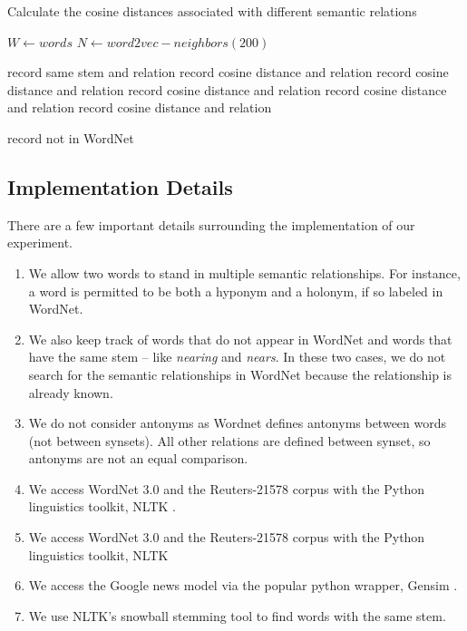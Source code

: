 \documentclass[titlepage]{article}
\begin{document}
\begin{algorithm}
\caption{Calculate the cosine distances associated with different semantic relations}
\begin{algorithmic}
\label{alg1}
\STATE $W \leftarrow words$
\STATE $N \leftarrow word2vec-neighbors(200)$

\STATE record same stem and relation 
\ELSE
{} 
\STATE record cosine distance and relation 
\ENDIF
{} 
\STATE record cosine distance and relation 
\ENDIF
{} 
\STATE record cosine distance and relation 
\ENDIF
{} 
\STATE record cosine distance and relation 
\ENDIF
{} 
\STATE record cosine distance and relation 
\ENDIF
\ENDIF

\ELSE
\STATE record not in WordNet

\ENDIF

\ENDFOR
\ENDFOR
\end{algorithmic}
\end{algorithm}

\subsection{Implementation Details}

There are a few important details surrounding the implementation of our experiment. 

\begin{enumerate}
  \item We allow two words to stand in multiple semantic relationships. For instance, a word is permitted to be both a hyponym and a holonym, if so labeled in WordNet. 
  \item We also keep track of words that do not appear in WordNet and words that have the same stem -- like \textit{nearing} and \textit{nears}. In these two cases, we do not search for the semantic relationships in WordNet because the relationship is already known.
  \item  We do not consider antonyms as Wordnet defines antonyms between words (not between synsets). All other relations are defined between synset, so antonyms are not an equal comparison. 
  \item  We access WordNet 3.0 and the Reuters-21578 \cite{rose2002reuters} corpus with the Python linguistics toolkit, NLTK \cite{BirdKleinLoper09}.
 \item  We access WordNet 3.0 and the Reuters-21578 \cite{rose2002reuters} corpus with the Python linguistics toolkit, NLTK 
 \item We access the Google news model via the popular python wrapper, Gensim \cite{gensim}.
 \item We use NLTK's snowball stemming tool to find words with the same stem. 
\end{enumerate}
\end{document}
